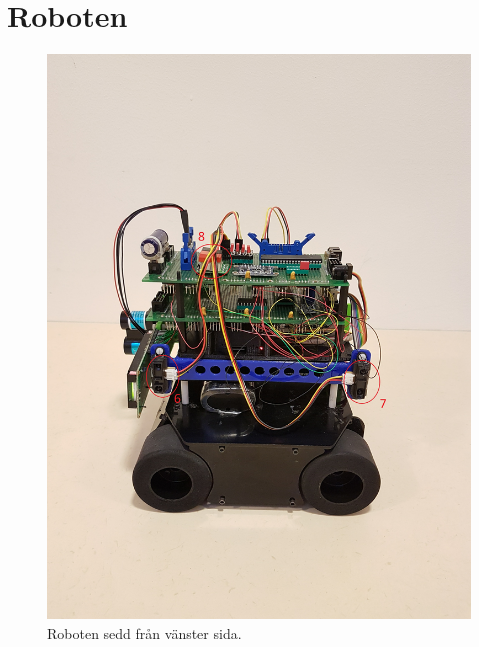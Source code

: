 \documentclass{article}
\begin{document}
\section{Roboten}
\begin{figure}[H]
\centering
\includegraphics[scale=0.1]{robot_left_side}
\caption{Roboten sedd från vänster sida.}
\label{fig:robot_left_side}
\end{figure}

\clearpage
\end{document}

